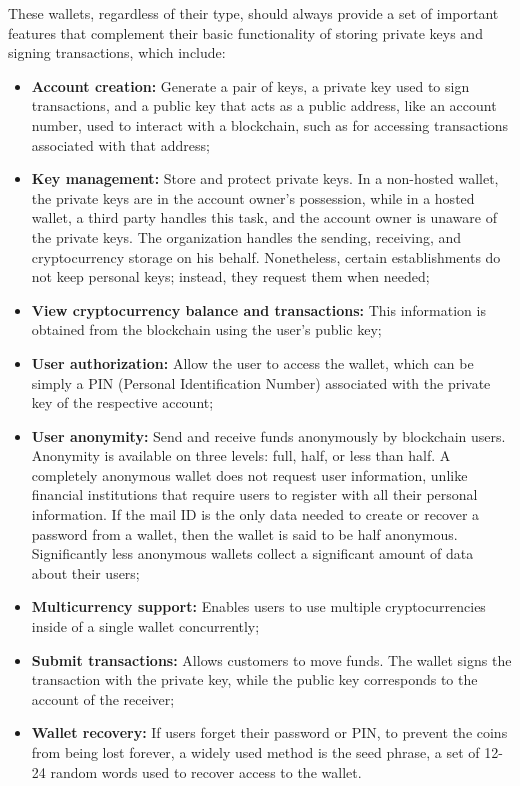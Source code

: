 These wallets, regardless of their type, should always provide a set of important features that complement their basic functionality of storing private keys and signing transactions, which include:
\begin{itemize}
    \item \textbf{Account creation:} Generate a pair of keys, a private key used to sign transactions, and a public key that acts as a public address, like an account number, used to interact with a blockchain, such as for accessing transactions associated with that address;
    \item \textbf{Key management:} Store and protect private keys. In a non-hosted wallet, the private keys are in the account owner's possession, while in a hosted wallet, a third party handles this task, and the account owner is unaware of the private keys. The organization handles the sending, receiving, and cryptocurrency storage on his behalf. Nonetheless, certain establishments do not keep personal keys; instead, they request them when needed;
    \item \textbf{View cryptocurrency balance and transactions:} This information is obtained from the blockchain using the user's public key;
    \item \textbf{User authorization:} Allow the user to access the wallet, which can be simply a PIN (Personal Identification Number) associated with the private key of the respective account;
    \item \textbf{User anonymity:} Send and receive funds anonymously by blockchain users. Anonymity is available on three levels: full, half, or less than half. A completely anonymous wallet does not request user information, unlike financial institutions that require users to register with all their personal information. If the mail ID is the only data needed to create or recover a password from a wallet, then the wallet is said to be half anonymous. Significantly less anonymous wallets collect a significant amount of data about their users;
    \item \textbf{Multicurrency support:} Enables users to use multiple cryptocurrencies inside of a single wallet concurrently;
    \item \textbf{Submit transactions:} Allows customers to move funds. The wallet signs the transaction with the private key, while the public key corresponds to the account of the receiver;
    \item \textbf{Wallet recovery:} If users forget their password or PIN, to prevent the coins from being lost forever, a widely used method is the seed phrase, a set of 12-24 random words used to recover access to the wallet.
\end{itemize}

